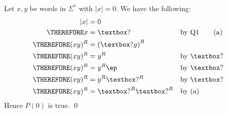         Let $x, y$ be words in $\Sigma^*$ with $|x| = 0$.
We have the following:
\begin{align*}
              |x| &= 0                                                 \\
\THEREFORE      x &= \answerbox{?}        & & \text{by Q1} \tag{a}     \\
\THEREFORE (xy)^R &= \left( \answerbox{?} y \right)^R  & &                          \\
\THEREFORE (xy)^R &= y^R                  & & \text{by \answerbox{?}}  \\
\THEREFORE (xy)^R &= y^R \ep              & & \text{by \answerbox{?}}  \\
\THEREFORE (xy)^R &= y^R \answerbox{?}^R  & & \text{by \answerbox{?}}  \\
\THEREFORE (xy)^R &= \answerbox{?}^R \answerbox{?}^R & & \text{by (a)} 
\end{align*}
Hence $P(0)$ is true.
\qed
\\

